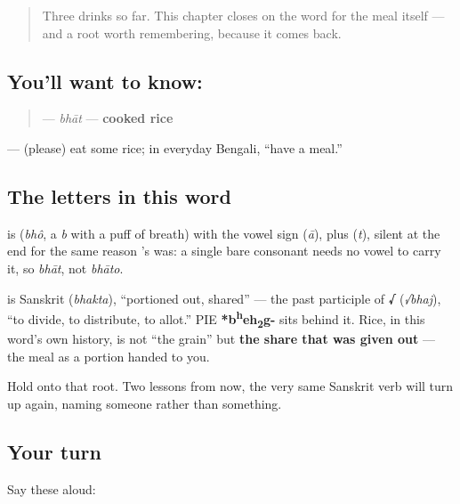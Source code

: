 \label{lesson:BN-C10-bhat}



\begin{quote}
Three drinks so far. This chapter closes on the word for the meal itself — and a root worth remembering, because it comes back.
\end{quote}

\subsection*{You'll want to know: }
\begin{quote}
\textbf{} — \emph{bhāt} — \textbf{cooked rice}
\end{quote}

\textbf{ } — (please) eat some rice; in everyday Bengali, \textquotedblleft{}have a meal.\textquotedblright{}

\subsection*{The letters in this word}
\textbf{} is \textbf{} (\emph{bhô}, a \emph{b} with a puff of breath) with the vowel sign \textbf{} (\emph{ā}), plus \textbf{} (\emph{t}), silent at the end for the same reason 's  was: a single bare consonant needs no vowel to carry it, so \emph{bhāt}, not \emph{bhāto}.

\begin{cousinweb}
\textbf{} is Sanskrit \textbf{} (\emph{bhakta}), \textquotedblleft{}portioned out, shared\textquotedblright{} — the past participle of \textbf{√} (\emph{√bhaj}), \textquotedblleft{}to divide, to distribute, to allot.\textquotedblright{} PIE \textbf{*b\textsuperscript{h}eh\textsubscript{2}g-} sits behind it. Rice, in this word's own history, is not \textquotedblleft{}the grain\textquotedblright{} but \textbf{the share that was given out} — the meal as a portion handed to you.

Hold onto that root. Two lessons from now, the very same Sanskrit verb will turn up again, naming someone rather than something.
\end{cousinweb}

\subsection*{Your turn}
Say these aloud:

